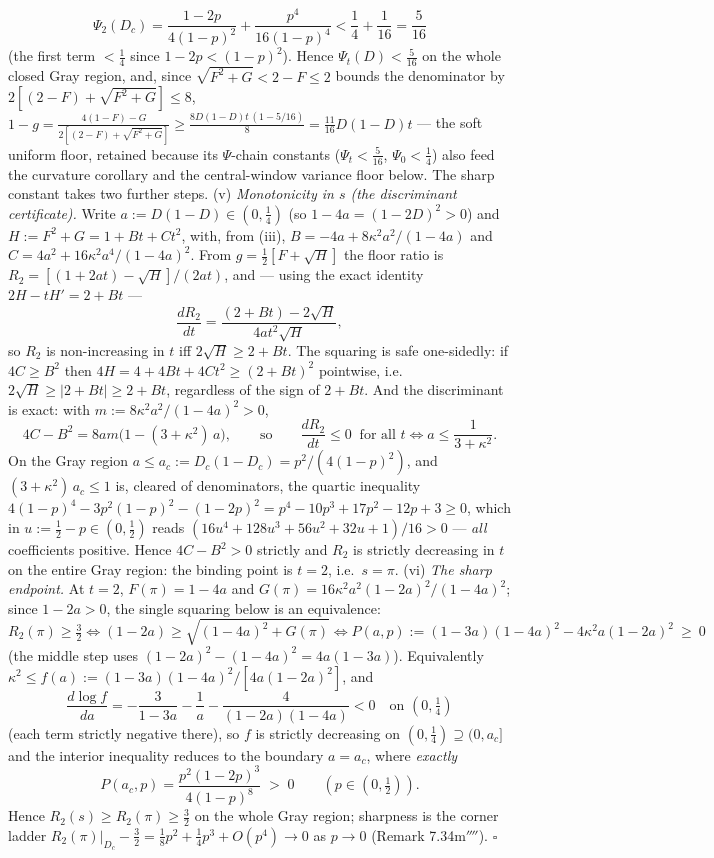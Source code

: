 \documentclass[
]{article}
\begin{document}
\[
  \Psi_2(D_c)=\frac{1-2p}{4(1-p)^2}+\frac{p^4}{16(1-p)^4}<\frac14+\frac1{16}=\frac5{16}
\]
(the first term $<\tfrac14$ since $1-2p<(1-p)^2$). Hence $\Psi_t(D)<\tfrac5{16}$ on the whole closed
Gray region, and, since $\sqrt{F^2+G}<2-F\le2$ bounds the denominator by $2[(2-F)+\sqrt{F^2+G}]\le8$,
$1-g=\tfrac{4(1-F)-G}{2[(2-F)+\sqrt{F^2+G}]}\ge\tfrac{8D(1-D)t\,(1-5/16)}{8}
=\tfrac{11}{16}D(1-D)t$ --- the soft uniform floor, retained because its
$\Psi$-chain constants ($\Psi_t<\tfrac5{16}$, $\Psi_0<\tfrac14$) also feed the
curvature corollary and the central-window variance floor below. The sharp
constant takes two further steps. (v) \emph{Monotonicity in $s$ (the
discriminant certificate).} Write $a:=D(1-D)\in(0,\tfrac14)$ (so $1-4a=(1-2D)^2>0$)
and $H:=F^2+G=1+Bt+Ct^2$, with, from (iii), $B=-4a+8\kappa^2a^2/(1-4a)$ and
$C=4a^2+16\kappa^2a^4/(1-4a)^2$. From $g=\tfrac12[F+\sqrt H]$ the floor ratio is
$R_2=[(1+2at)-\sqrt H]/(2at)$, and --- using the exact identity $2H-tH'=2+Bt$ ---
\[
  \frac{dR_2}{dt}=\frac{(2+Bt)-2\sqrt H}{4at^2\sqrt H},
\]
so $R_2$ is non-increasing in $t$ iff $2\sqrt H\ge2+Bt$. The squaring is safe
one-sidedly: if $4C\ge B^2$ then $4H=4+4Bt+4Ct^2\ge(2+Bt)^2$ pointwise, i.e.\
$2\sqrt H\ge|2+Bt|\ge2+Bt$, regardless of the sign of $2+Bt$. And the
discriminant is exact: with $m:=8\kappa^2a^2/(1-4a)^2>0$,
\[
  4C-B^2=8am\bigl(1-(3+\kappa^2)\,a\bigr),\qquad\text{so}\qquad
  \frac{dR_2}{dt}\le0\ \text{ for all }t\iff a\le\frac1{3+\kappa^2}.
\]
On the Gray region $a\le a_c:=D_c(1-D_c)=p^2/(4(1-p)^2)$, and
$(3+\kappa^2)\,a_c\le1$ is, cleared of denominators, the quartic inequality
$4(1-p)^4-3p^2(1-p)^2-(1-2p)^2=p^4-10p^3+17p^2-12p+3\ge0$, which in
$u:=\tfrac12-p\in(0,\tfrac12)$ reads $(16u^4+128u^3+56u^2+32u+1)/16>0$ ---
\emph{all} coefficients positive. Hence $4C-B^2>0$ strictly and $R_2$ is
strictly decreasing in $t$ on the entire Gray region: the binding point is
$t=2$, i.e.\ $s=\pi$. (vi) \emph{The sharp endpoint.} At $t=2$, $F(\pi)=1-4a$
and $G(\pi)=16\kappa^2a^2(1-2a)^2/(1-4a)^2$; since $1-2a>0$, the single
squaring below is an equivalence:
\[
  R_2(\pi)\ge\tfrac32\iff(1-2a)\ge\sqrt{(1-4a)^2+G(\pi)}
  \iff P(a,p):=(1-3a)(1-4a)^2-4\kappa^2a(1-2a)^2\ \ge\ 0
\]
(the middle step uses $(1-2a)^2-(1-4a)^2=4a(1-3a)$). Equivalently
$\kappa^2\le f(a):=(1-3a)(1-4a)^2/[4a(1-2a)^2]$, and
\[
  \frac{d\log f}{da}=-\frac{3}{1-3a}-\frac1a-\frac{4}{(1-2a)(1-4a)}<0
  \quad\text{on }(0,\tfrac14)
\]
(each term strictly negative there), so $f$ is strictly decreasing on
$(0,\tfrac14)\supseteq(0,a_c]$ and the interior inequality reduces to the
boundary $a=a_c$, where \emph{exactly}
\[
  P(a_c,p)=\frac{p^2(1-2p)^3}{4(1-p)^8}\;>\;0\qquad(p\in(0,\tfrac12)).
\]
Hence $R_2(s)\ge R_2(\pi)\ge\tfrac32$ on the whole Gray region; sharpness is
the corner ladder $R_2(\pi)\big|_{D_c}-\tfrac32=\tfrac18p^2+\tfrac14p^3+O(p^4)
\to0$ as $p\to0$ (Remark 7.34m$''''$). \hfill$\square$
\end{document}
